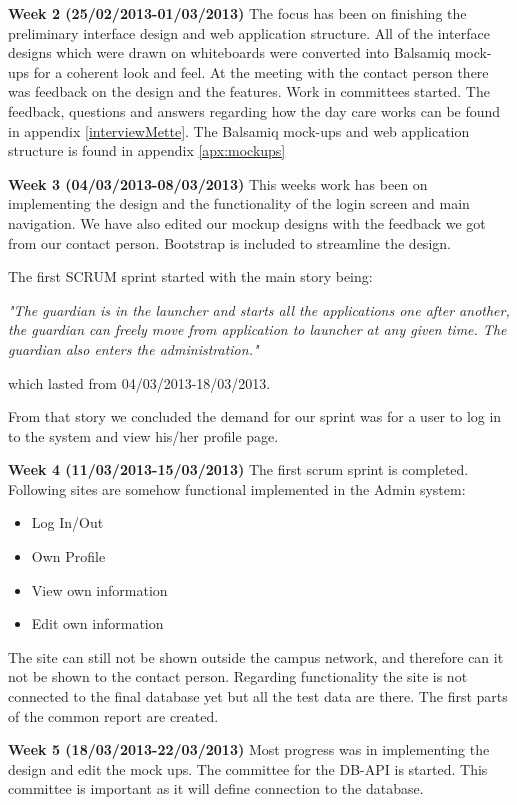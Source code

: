 \textbf{Week 2 (25/02/2013-01/03/2013)}
The focus has been on finishing the preliminary interface design and web application structure.
All of the interface designs which were drawn on whiteboards were converted into Balsamiq mock-ups for a coherent look and feel.
At the meeting with the contact person there was feedback on the design and the features. 
Work in committees started. 
The feedback, questions and answers regarding how the day care works can be found in appendix \vref{interviewMette}.
The Balsamiq mock-ups and web application structure is found in appendix \vref{apx:mockups} 

\textbf{Week 3 (04/03/2013-08/03/2013)}
This weeks work has been on implementing the design and the functionality of the login screen and main navigation.  
We have also edited our mockup designs with the feedback we got from our contact person. 
Bootstrap is included to streamline the design. 

The first SCRUM sprint  started with the main story being:

\textit{"The guardian is in the launcher and starts all the applications one after another, the guardian can freely move from application to launcher at any given time.
The guardian also enters the administration."}

which lasted from 04/03/2013-18/03/2013. 

From that story we concluded the demand for our sprint was for a user to log in to the system and view his/her profile page. 

\textbf{Week 4 (11/03/2013-15/03/2013) }
The first scrum sprint is completed. 
Following sites are somehow functional implemented in the Admin system:
\begin{itemize}
        \item Log In/Out
        \item Own Profile
        \item View own information
        \item Edit own information
\end{itemize}
The site can still not be shown outside the campus network, and therefore can it not be shown to the contact person.
Regarding functionality the site is not connected to the final database yet but all the test data are there.  
The first parts of the common report are created.

\textbf{Week 5 (18/03/2013-22/03/2013)}
Most progress was in implementing the design and edit the mock ups. The committee for the DB-API is started. This committee is important as it will define connection to the database. 

